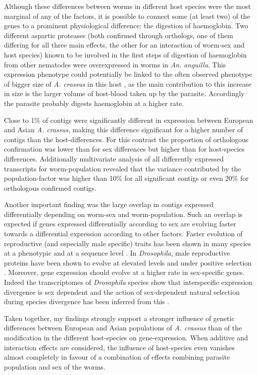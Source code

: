 Although these differences between worms in different host species
were the most marginal of any of the factors, it is possible to
connect some (at least two) of the genes to a prominent physiological
difference: the digestion of haemoglobin. Two different aspartic
proteases (both confirmed through orthologs, one of them differing for
all three main effects, the other for an interaction of worm-sex and
host species) known to be involved in the first steps of digestion of
haemoglobin from other nematodes \cite{pmid12782060} were
overexpressed in worms in \textit{An. anguilla}. This expression
phenotype could potentially be linked to the often observed phenotype
of bigger size of \textit{A. crassus} in this host
\cite{knopf_swimbladder_2006}, as the main contribution to this
increase in size is the larger volume of host-blood taken up by the
parasite. Accordingly the parasite probably digests haemoglobin at a
higher rate.

Close to 1\% of contigs were significantly different in expression
between European and Asian \textit{A. crassus}, making this difference
significant for a higher number of contigs than the
host-differences. For this contrast the proportion of orthologous
confirmation was lower than for sex differences but higher than for
host-species differences. Additionally multivariate analysis of all
differently expressed transcripts for worm-population revealed that
the variance contributed by the population-factor was higher than 10\%
for all significant contigs or even 20\% for orthologous confirmed
contigs.

Another important finding was the large overlap in contigs expressed
differentially depending on worm-sex and worm-population. Such an
overlap is expected if genes expressed differentially according to sex
are evolving faster towards a differential expression according to
other factors. Faster evolution of reproductive (and especially male
specific) traits has been shown in many species at a phenotypic and at
a sequence level \cite{pmid15795858}. In \textit{Drosophila}, male
reproductive proteins have been shown to evolve at elevated levels and
under positive selection \cite{pmid11404480}. Moreover, gene
expression should evolve at a higher rate in sex-specific genes.
Indeed the transcriptomes of \textit{Drosophila} species show that
interspecific expression divergence is sex dependent and the action of
sex-dependent natural selection during species divergence has been
inferred from this \cite{pmid15034135,pmid19720861}.

Taken together, my findings strongly support a stronger influence of
genetic differences between European and Asian populations of
\textit{A. crassus} than of the modification in the different
host-species on gene-expression. When additive and interaction effects
are considered, the influence of host-species even vanishes almost
completely in favour of a combination of effects combining parasite
population and sex of the worms.

